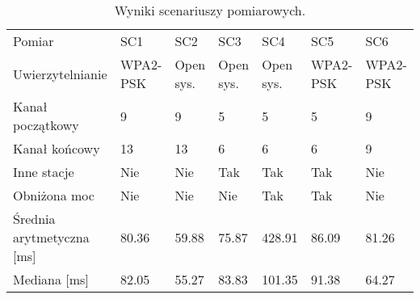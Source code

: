 \begin{sidewaystable}
\caption{Wyniki scenariuszy pomiarowych.}
\label{tab:Results}
\begin{tabular}{ | l || l | l | l | l | l | l | }
\hline                       
Pomiar & SC1 & SC2 & SC3 & SC4 & SC5 & SC6 \\ 
Uwierzytelnianie & WPA2-PSK & Open sys. & Open sys. & Open sys. & WPA2-PSK & WPA2-PSK \\
Kanał początkowy & 9 & 9 & 5 & 5 & 5 & 9 \\
Kanał końcowy & 13 & 13 & 6  & 6 & 6 & 9 \\
Inne stacje & Nie & Nie & Tak & Tak & Tak & Nie \\
Obniżona moc & Nie & Nie & Nie & Tak & Tak & Nie \\ \hline \hline
Średnia arytmetyczna [ms] & 80.36 & 59.88 & 75.87 & 428.91 & 86.09 & 81.26 \\ \hline \hline
Mediana [ms] & 82.05 & 55.27 & 83.83 & 101.35 & 91.38 & 64.27 \\
\hline  
\end{tabular}

\end{sidewaystable}







